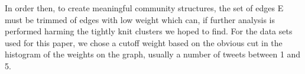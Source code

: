 In order then, to create meaningful community structures, the set of edges E must be trimmed of edges with low weight which can, if further analysis is performed harming the tightly knit clusters we hoped to find.  For the data sets used for this paper, we chose a cutoff weight based on the obvious cut in the histogram of the weights on the graph, usually a number of tweets between 1 and 5.